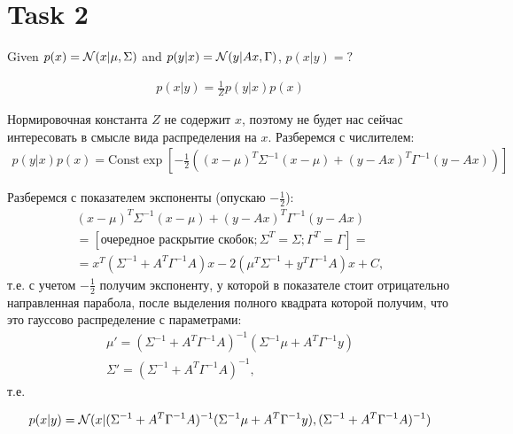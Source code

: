 \section{Task 2}

\begin{task}
    Given $p(x) = \mathcal{N}(x|\mu, \Sigma)$ and $p(y|x) = \mathcal{N}(y|Ax, \Gamma)$, $p(x|y) = ?$
\end{task}

\begin{solution}
    \begin{gather}
        p(x|y) = \frac{1}{Z} p(y|x)p(x)
    \end{gather}

    Нормировочная константа $Z$ не содержит $x$, поэтому не будет нас сейчас интересовать в смысле вида распределения на $x$. Разберемся с числителем:
    \begin{gather}
        p(y|x)p(x) = \text{Const} \exp[-\frac12 ((x - \mu)^T \Sigma^{-1} (x - \mu) + (y - Ax)^T \Gamma^{-1} (y - Ax))]
    \end{gather}

    Разберемся с показателем экспоненты (опускаю $-\frac12$):
    \begin{gather}
        (x - \mu)^T \Sigma^{-1} (x - \mu) + (y - Ax)^T \Gamma^{-1} (y - Ax) \\
        = [\text{очередное раскрытие скобок}; \Sigma^T = \Sigma; \Gamma^T = \Gamma] = \\
        = x^T (\Sigma^{-1} + A^T \Gamma^{-1} A) x - 2(\mu^T \Sigma^{-1} + y^T \Gamma^{-1} A) x + C,
    \end{gather}
    т.е. с учетом $-\frac12$ получим экспоненту, у которой в показателе стоит отрицательно направленная парабола, после выделения полного квадрата которой получим, что это гауссово распределение с параметрами:
    \begin{gather}
        \mu' = (\Sigma^{-1} + A^T \Gamma^{-1} A)^{-1}(\Sigma^{-1} \mu + A^T \Gamma^{-1} y) \\
        \Sigma' = (\Sigma^{-1} + A^T \Gamma^{-1} A)^{-1},
    \end{gather}
    т.е.

    \begin{equation}
        p(x|y) = \mathcal{N}(x|(\Sigma^{-1} + A^T \Gamma^{-1} A)^{-1}(\Sigma^{-1} \mu + A^T \Gamma^{-1} y), (\Sigma^{-1} + A^T \Gamma^{-1} A)^{-1})
    \end{equation}

\end{solution}

